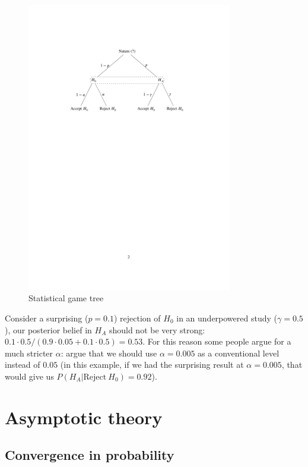 \documentclass[10pt]{article}
\begin{document}
\begin{figure}[tb]
  \begin{center}
\includegraphics[width=0.8\textwidth]{../graphs/B.pdf}
  \end{center}
\caption{Statistical game tree}\label{fig:B}
\end{figure}

Consider a surprising ($p=0.1$) rejection of $H_0$  in an underpowered study ($\gamma=0.5$),
our posterior belief in $H_{\!A}$ should not be very strong: $0.1\cdot 0.5 /
(0.9\cdot 0.05 + 0.1\cdot 0.5) = 0.53$. For this reason some people argue for a
much stricter $\alpha$: \citet{Benjamin2017} argue that we should use
$\alpha=0.005$ as a conventional level instead of $0.05$ (in this example, if we had
the surprising result at $\alpha=0.005$, that would give us $P(H_{\!A}|\mathrm{Reject}\ H_0)=0.92$). 




\section{Asymptotic theory}\label{sec:asymptotics}

\subsection{Convergence in probability}
\end{document}
